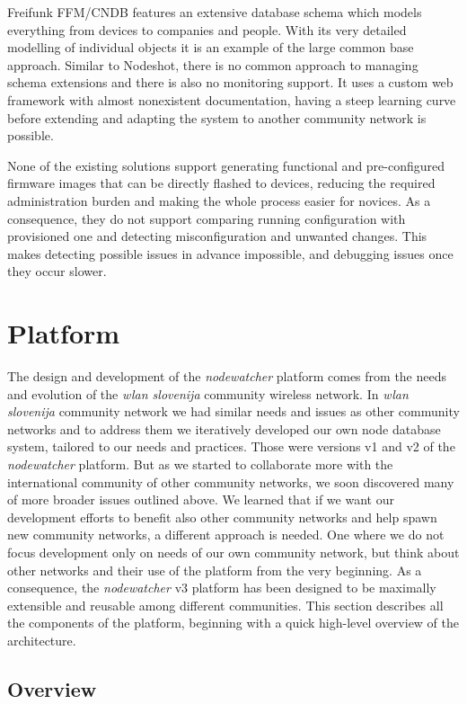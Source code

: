 \documentclass[5p,sort&compress]{elsarticle}
\newcommand{\nodewatcher}{\textit{nodewatcher}}
\newcommand{\wlanslovenija}{\textit{wlan slovenija}}
\begin{document}
Freifunk FFM/CNDB features an extensive database schema which models everything from devices to companies and people.
With its very detailed modelling of individual objects it is an example of the large common base approach.
Similar to Nodeshot, there is no common approach to managing schema extensions and there is also no monitoring support.
It uses a custom web framework with almost nonexistent documentation, having a steep learning curve before extending and adapting the system to another community network is possible.

None of the existing solutions support generating functional and pre-configured firmware images that can be directly flashed to devices, reducing the required administration burden and making the whole process easier for novices.
As a consequence, they do not support comparing running configuration with provisioned one and detecting misconfiguration and unwanted changes.
This makes detecting possible issues in advance impossible, and debugging issues once they occur slower.

\section{Platform}
\label{sec:platform}

The design and development of the \nodewatcher{} platform comes from the needs and evolution of the \wlanslovenija{} community wireless network.
In \wlanslovenija{} community network we had similar needs and issues as other community networks and to address them we iteratively developed our own node database system, tailored to our needs and practices.
Those were versions v1 and v2 of the \nodewatcher{} platform.
But as we started to collaborate more with the international community of other community networks, we soon discovered many of more broader issues outlined above.
We learned that if we want our development efforts to benefit also other community networks and help spawn new community networks, a different approach is needed.
One where we do not focus development only on needs of our own community network, but think about other networks and their use of the platform from the very beginning.
As a consequence, the \nodewatcher{} v3 platform has been designed to be maximally extensible and reusable among different communities.
This section describes all the components of the platform, beginning with a quick high-level overview of the architecture.

\subsection{Overview}
\end{document}
